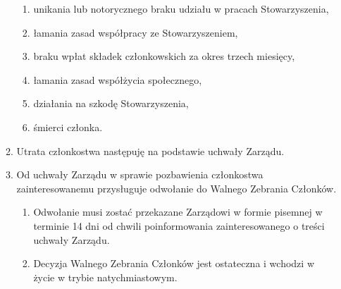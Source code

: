 \documentclass[a4paper,draft,10pt]{article}
\begin{document}
\begin{enumerate}
\begin{enumerate}
\begin{enumerate}
            \item unikania lub notorycznego braku udziału w pracach Stowarzyszenia,
            \item łamania zasad współpracy ze Stowarzyszeniem,
            \item braku wpłat składek członkowskich za okres trzech miesięcy,
            \item łamania zasad współżycia społecznego,
            \item działania na szkodę Stowarzyszenia,
            \item śmierci członka.
          \end{enumerate}
        \item Utrata członkostwa następuję na podstawie uchwały Zarządu.
        \item Od uchwały Zarządu w sprawie pozbawienia członkostwa zainteresowanemu przysługuje odwołanie do Walnego Zebrania Członków.
          \begin{enumerate}
            \item Odwołanie musi zostać przekazane Zarządowi w formie pisemnej w terminie 14 dni od chwili poinformowania zainteresowanego o treści uchwały Zarządu.
            \item Decyzja Walnego Zebrania Członków jest ostateczna i wchodzi w życie w trybie natychmiastowym.
          \end{enumerate}
      \end{enumerate}
  \end{enumerate}
\end{document}

